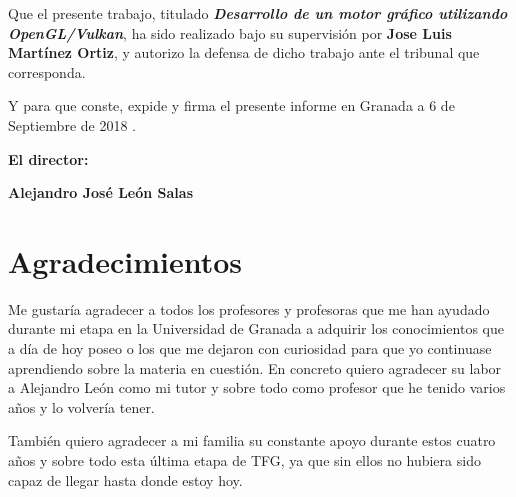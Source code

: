 \vspace{0.5cm}

Que el presente trabajo, titulado \textit{\textbf{Desarrollo de un motor gráfico utilizando
OpenGL/Vulkan}},
ha sido realizado bajo su supervisión por \textbf{Jose Luis Martínez Ortiz}, y autorizo la defensa de dicho trabajo ante el tribunal
que corresponda.

\vspace{0.5cm}

Y para que conste, expide y firma el presente informe en Granada a 6 de Septiembre de 2018 .

\vspace{1cm}

\textbf{El director:}

\vspace{5cm}

\noindent \textbf{Alejandro José León Salas \ \ \ \ \ }

\chapter*{Agradecimientos}
\thispagestyle{empty}

       \vspace{1cm}


Me gustaría agradecer a todos los profesores y profesoras que me han ayudado durante mi etapa en la Universidad de Granada a adquirir los conocimientos que a día de hoy poseo o los que me dejaron con curiosidad para que yo continuase aprendiendo sobre la materia en cuestión. En concreto quiero agradecer su labor a Alejandro León como mi tutor y sobre todo como profesor que he tenido varios años y lo volvería tener. 

También quiero agradecer a mi familia su constante apoyo durante estos cuatro años y sobre todo esta última etapa de TFG, ya que sin ellos no hubiera sido capaz de llegar hasta donde estoy hoy.

